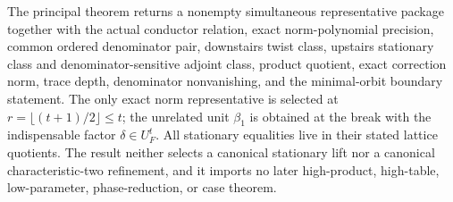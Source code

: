 \begin{theorem}
\leanok
{}
\FormalizationContract
The principal theorem returns a nonempty simultaneous representative
package together with the actual conductor relation, exact norm-polynomial
precision, common ordered denominator pair, downstairs twist class,
upstairs stationary class and denominator-sensitive adjoint class, product
quotient, exact correction norm, trace depth, denominator nonvanishing, and
the minimal-orbit boundary statement.  The only exact norm representative
is selected at $r=\lfloor(t+1)/2\rfloor\leq t$; the unrelated unit
$\beta_1$ is obtained at the break with the indispensable factor
$\delta\in U_F^t$.  All stationary equalities live in their stated lattice
quotients.  The result neither selects a canonical stationary lift nor a
canonical characteristic-two refinement, and it imports no later
high-product, high-table, low-parameter, phase-reduction, or case theorem.
\end{theorem}
